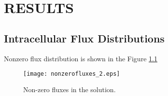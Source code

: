 \chapter{RESULTS}
\section{Intracellular Flux Distributions}
Nonzero flux distribution is shown in the Figure \ref{fig:nonzerofluxes}
\begin{figure}[H]
  \texttt{[image: nonzerofluxes\_2.eps]}
  \caption[Non-zero fluxes in the solution]{Non-zero fluxes in the solution.}
\label{fig:nonzerofluxes}
\end{figure}
